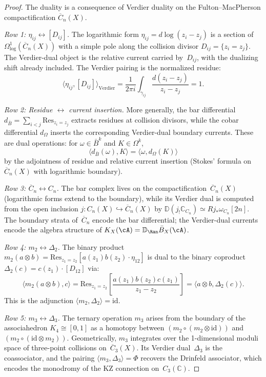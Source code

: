 \begin{proof}
The duality is a consequence of Verdier duality on the Fulton--MacPherson compactification $\overline{C}_n(X)$.

\emph{Row 1: $\eta_{ij} \leftrightarrow [D_{ij}]$.}
The logarithmic form $\eta_{ij} = d\log(z_i - z_j)$ is a section of $\Omega^1_{\log}(\overline{C}_n(X))$ with a simple pole along the collision divisor $D_{ij} = \{z_i = z_j\}$. The Verdier-dual object is the relative current carried by~$D_{ij}$, with the dualizing shift already included. The Verdier pairing is the normalized residue:
\[
\langle \eta_{ij}, [D_{ij}] \rangle_{\mathrm{Verdier}}
=
\frac{1}{2\pi i}
\int_{\gamma_{ij}}\frac{d(z_i-z_j)}{z_i-z_j}
=1 .
\]

\emph{Row 2: Residue $\leftrightarrow$ current insertion.}
More generally, the bar differential $d_{\bar{B}} = \sum_{i<j} \mathrm{Res}_{z_i = z_j}$ extracts residues at collision divisors, while the cobar differential $d_\Omega$ inserts the corresponding Verdier-dual boundary currents. These are dual operations: for $\omega \in \bar{B}^k$ and $K \in \Omega^k$,
\[
\langle d_{\bar{B}}(\omega), K \rangle = \langle \omega, d_\Omega(K) \rangle
\]
by the adjointness of residue and relative current insertion
(Stokes' formula on~$\overline{C}_n(X)$ with logarithmic boundary).

\emph{Row 3: $\overline{C}_n \leftrightarrow C_n$.}
The bar complex lives on the compactification~$\overline{C}_n(X)$
(logarithmic forms extend to the boundary), while its Verdier dual is
computed from the open inclusion
$j\colon C_n(X)\hookrightarrow\overline C_n(X)$ by
$\mathbb D(j_!\mathbb C_{C_n})\simeq Rj_*\omega_{C_n}[2n]$.
The boundary strata of~$\overline{C}_n$ encode the bar differential;
the Verdier-dual currents encode the algebra structure of
$K_X(\cA)=\mathbb D_{\Ran}\bar B_X(\cA)$.

\emph{Row 4: $m_2 \leftrightarrow \Delta_2$.}
The binary product $m_2(a \otimes b) = \mathrm{Res}_{z_1=z_2}[a(z_1) b(z_2) \cdot \eta_{12}]$ is dual to the binary coproduct $\Delta_2(c) = c(z_1) \cdot [D_{12}]$ via:
\[
\langle m_2(a \otimes b), c \rangle = \mathrm{Res}_{z_1=z_2}\!\left[\frac{a(z_1) b(z_2) c(z_1)}{z_1 - z_2}\right] = \langle a \otimes b, \Delta_2(c) \rangle.
\]
This is the adjunction $\langle m_2, \Delta_2 \rangle = \mathrm{id}$.

\emph{Row 5: $m_3 \leftrightarrow \Delta_3$.}
The ternary operation $m_3$ arises from the boundary of the associahedron $K_4 \cong [0,1]$ as a homotopy between $(m_2 \circ (m_2 \otimes \mathrm{id}))$ and $(m_2 \circ (\mathrm{id} \otimes m_2))$. Geometrically, $m_3$ integrates over the 1-dimensional moduli space of three-point collisions on~$\overline{C}_3(X)$. Its Verdier dual~$\Delta_3$ is the coassociator, and the pairing $\langle m_3, \Delta_3 \rangle = \Phi$ recovers the Drinfeld associator, which encodes the monodromy of the KZ connection on~$C_3(\mathbb{C})$.
\end{proof}

